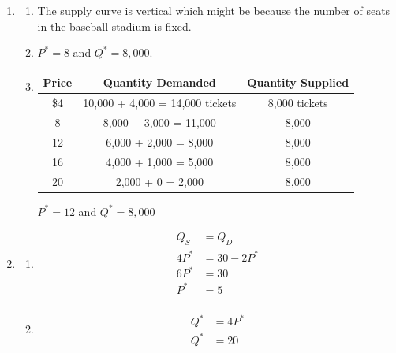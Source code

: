 \documentclass{article}
\begin{document}
\begin{enumerate}
\begin{enumerate}
	\end{enumerate}
	
\newpage
	
\item

	\begin{enumerate}
	
	\item The supply curve is vertical which might be because the number of seats in the baseball stadium is fixed.
	
	\item $P^* = 8$ and $Q^* = 8,000$.
	
	\item 
	
	\begin{center}
	\begin{tabular}{c c c}
	\textbf{Price} & \textbf{Quantity Demanded} & \textbf{Quantity Supplied} \\
	\hline
	\$4 & 10,000 + 4,000  = 14,000 tickets & 8,000 tickets \\
	8 & 8,000 + 3,000  = 11,000 & 8,000 \\
	12 & 6,000  + 2,000 = 8,000 & 8,000 \\
	16 & 4,000 + 1,000 = 5,000 & 8,000 \\
	20 & 2,000 + 0 = 2,000 & 8,000
	\end{tabular}
	\end{center}
	
	$P^* = 12$ and $Q^* = 8,000$
	
	\end{enumerate}
	
\item

	\begin{enumerate}
	
	\item
	\begin{align*}
	Q_S &= Q_D \\
	4P^* &= 30 - 2P^* \\
	6P^* &= 30 \\
	P^* &= 5 \\
	\end{align*}
	
	\item
	\begin{align*}
	Q^* &= 4P^* \\
	Q^* &= 20
	\end{align*}
	
	\end{enumerate}
	

\end{enumerate}
\end{document}
